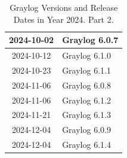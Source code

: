 \documentclass[../main.tex]{subfiles}
\begin{document}
\begin{table}[h]
\begin{minipage}{0.45\textwidth}
\begin{tabular}{|c|l|}
    2024-10-02 & Graylog 6.0.7 \\ \hline  
    2024-10-12 & Graylog 6.1.0 \\ \hline  
    2024-10-23 & Graylog 6.1.1 \\ \hline  
    2024-11-06 & Graylog 6.0.8 \\ \hline  
    2024-11-06 & Graylog 6.1.2 \\ \hline  
    2024-11-21 & Graylog 6.1.3 \\ \hline  
    2024-12-04 & Graylog 6.0.9 \\ \hline  
    2024-12-04 & Graylog 6.1.4 \\ \hline  
\end{tabular}
\caption{Graylog Versions and Release Dates in Year 2024. Part 2. \protect\footnotemark[13]}
\label{table:graylog_versions}
\end{minipage}
\end{table}

\end{document}

